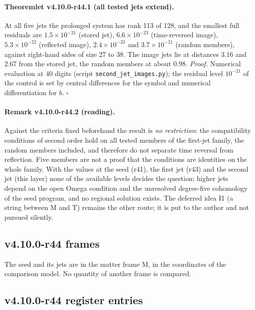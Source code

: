 \paragraph{Theoremlet v4.10.0-r44.1 (all tested jets extend).}
At all five jets the prolonged system has rank 113 of 128, and the smallest full residuals are \(1.5\times10^{-21}\) (stored jet),
\(6.6\times10^{-23}\) (time-reversed image), \(5.3\times10^{-22}\) (reflected image), \(2.4\times10^{-23}\) and \(3.7\times10^{-21}\) (random members), against
right-hand sides of size 27 to 38.  The image jets lie at distances \(3.16\) and \(2.67\) from the stored jet, the random members at about \(0.98\).
\emph{Proof.} Numerical evaluation at 40 digits (script \texttt{second\_\allowbreak jet\_\allowbreak images.py}); the residual level \(10^{-21}\) of the control is set by
central differences for the symbol and numerical differentiation for \(b\).  \(\square\)

\paragraph{Remark v4.10.0-r44.2 (reading).}
Against the criteria fixed beforehand the result is \emph{no restriction}: the compatibility conditions of second order hold on all tested
members of the first-jet family, the random members included, and therefore do not separate time reversal from reflection.  Five members are
not a proof that the conditions are identities on the whole family.  With the values at the seed (r41), the first jet (r43) and the second jet
(this layer) none of the available levels decides the question; higher jets depend on the open Omega condition and the unresolved degree-five
cohomology of the seed program, and no regional solution exists.  The deferred idea I1 (a string between M and T) remains the other route; it
is put to the author and not pursued silently.

\subsection*{v4.10.0-r44 frames}
\label{subsec:v4100-r44-frames}

The seed and its jets are in the matter frame M, in the coordinates of the comparison model.  No quantity of another frame is compared.

\subsection*{v4.10.0-r44 register entries}
\label{subsec:v4100-r44-register}

